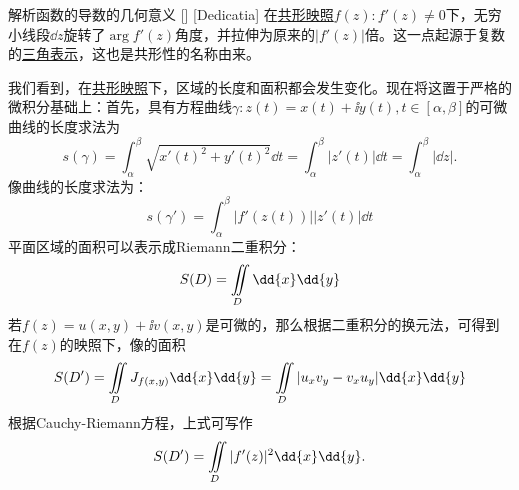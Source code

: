 \documentclass[UTF8]{ctexart}
\newcommand{\AngularForm}{\hyperref[dfn:AngularForm]{三角表示}}
\newcommand{\ConformalMapping}{\hyperref[dfn:ConformalMapping]{共形映照}}
\begin{document}
\begin{crl}
    [UUID]
    {解析函数的导数的几何意义}
    []
    [Dedicatia]
    在\ConformalMapping $f(z): f'(z)\neq 0$下，无穷小线段$\dd{z}$旋转了$\arg f'(z)$角度，并拉伸为原来的$|f'(z)|$倍。这一点起源于复数的\AngularForm，这也是共形性的名称由来。
\end{crl}
我们看到，在\ConformalMapping 下，区域的长度和面积都会发生变化。现在将这置于严格的微积分基础上：首先，具有方程曲线$\gamma:z(t)=x(t)+\ii y(t), t\in[\alpha,\beta]$的可微曲线的长度求法为
\[s(\gamma)=\int_\alpha^\beta\sqrt{x'(t)^2+y'(t)^2}\dd{t}=\int_{\alpha}^{\beta}|z'(t)|\dd{t}=\int_{\alpha}^\beta|\dd{z}|. \]
像曲线的长度求法为：
\[s(\gamma')=\int_{\alpha}^{\beta}|f'(z(t))||z'(t)|\dd{t}\]
平面区域的面积可以表示成Riemann二重积分：
\[S(D)=\iintop_D\dd{x}\dd{y}\]
若$f(z)=u(x,y)+\ii v(x,y)$是可微的，那么根据二重积分的换元法，可得到在$f(z)$的映照下，像的面积
\[S(D')=\iintop_{D} J_{f(x,y)}\dd{x}\dd{y}=\iintop_{D}|u_xv_y-v_xu_y|\dd{x}\dd{y}\]
根据Cauchy-Riemann方程，上式可写作
\[S(D')=\iintop_{D}|f'(z)|^2\dd{x}\dd{y}.\]
\end{document}
